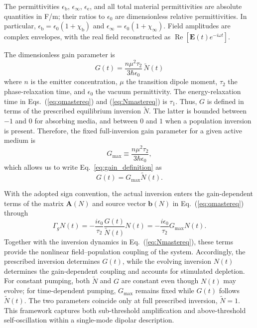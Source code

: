 \documentclass{optica-article}
\begin{document}
The permittivities $\epsilon_{\mathrm b}$, $\epsilon_{\infty}$, $\epsilon_{\mathrm e}$, and all total material permittivities are absolute quantities in F/m; their ratios to $\epsilon_0$ are dimensionless relative permittivities. In particular, $\epsilon_{\mathrm b}=\epsilon_0(1+\chi_{\mathrm b})$ and $\epsilon_{\infty}=\epsilon_0(1+\chi_{\infty})$. Field amplitudes are complex envelopes, with the real field reconstructed as $\operatorname{Re}[\mathbf E(t)e^{-i\omega t}]$.

The dimensionless gain parameter is
\begin{equation}
G(t)=\frac{n\mu^2\tau_2}{3\hbar\epsilon_0}\,\widetilde N(t)
\label{eq:gain_definition}
\end{equation}
%
where $n$ is the emitter concentration, $\mu$ the transition dipole moment, $\tau_2$ the phase-relaxation time, and $\epsilon_0$ the vacuum permittivity. The energy-relaxation time in Eqs.~(\ref{eq:qmastereq}) and (\ref{eq:Nmastereq}) is $\tau_1$.
%
Thus, $G$ is defined in terms of the prescribed equilibrium inversion $\widetilde N$. The latter is bounded between $-1$ and $0$ for absorbing media, and between $0$ and $1$ when a population inversion is present. Therefore, the fixed full-inversion gain parameter for a given active medium is
%
\begin{equation}
G_{\max}\equiv\frac{n\mu^2\tau_2}{3\hbar\epsilon_0},
\end{equation}
which allows us to write Eq.~\ref{eq:gain_definition} as
\begin{equation}
G(t)=G_{\max}\widetilde N(t).
\end{equation}

With the adopted sign convention, the actual inversion enters the gain-dependent terms of the matrix $\mathbf A(N)$ and source vector $\mathbf b(N)$ in Eq.~(\ref{eq:qmastereq}) through
\begin{equation}
\Gamma_g N(t)=-\frac{i\epsilon_0}{\tau_2} \frac{G(t)}{\widetilde N(t)}N(t)
=-\frac{i\epsilon_0}{\tau_2}G_{\max}N(t).
\label{eq:gain_dynamic_coupling}
\end{equation}
Together with the inversion dynamics in Eq.~(\ref{eq:Nmastereq}), these terms provide the nonlinear field--population coupling of the system. Accordingly, the prescribed inversion determines $G(t)$, while the evolving inversion $N(t)$ determines the gain-dependent coupling and accounts for stimulated depletion.  For constant pumping, both $\widetilde N$ and $G$ are constant even though $N(t)$ may evolve; for time-dependent pumping, $G_{\max}$ remains fixed while $G(t)$ follows $\widetilde N(t)$. The two parameters coincide only at full prescribed inversion, $\widetilde N=1$. This framework captures both sub-threshold amplification and above-threshold self-oscillation within a single-mode dipolar description.
\end{document}
